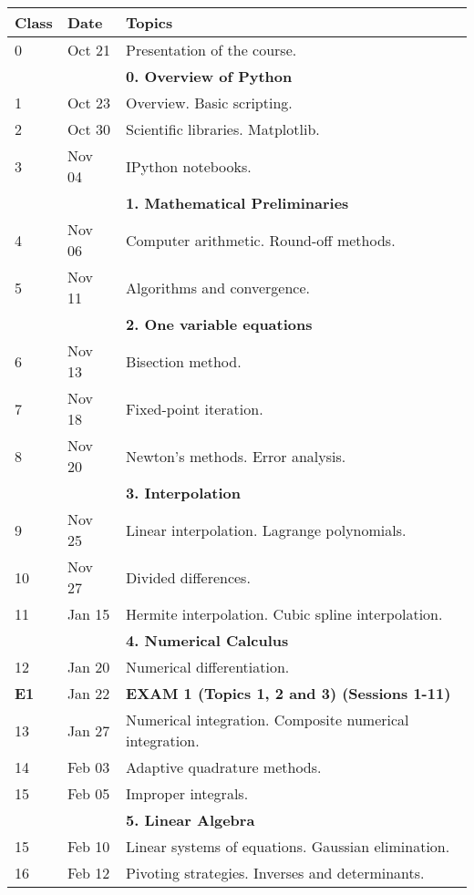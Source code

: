 \documentclass[a4,useAMS,usenatbib,usegraphicx,12pt]{article}
\begin{document}
\begin{table}[!ht]
\begin{small}
\begin{flushleft}
\begin{center}
  \begin{tabular}{l  l  l} \hline\hline
	\centering\textbf{Class} & \textbf{Date} & \textbf{Topics} \\ \hline
	0 & Oct 21& Presentation of the course. \\
	& & \textbf{0. Overview of Python} \\
	1 & Oct 23& Overview. Basic scripting. \\
	2 & Oct 30& Scientific libraries. Matplotlib. \\
	3 & Nov 04& IPython notebooks. \\
	& & \textbf{1. Mathematical Preliminaries} \\
	4 & Nov 06& Computer arithmetic. Round-off methods. \\
	5 & Nov 11& Algorithms and convergence. \\
	& & \textbf{2. One variable equations} \\
	6 & Nov 13& Bisection method. \\
	7 & Nov 18& Fixed-point iteration. \\
	8 & Nov 20& Newton's methods. Error analysis. \\
	& & \textbf{3. Interpolation} \\
	9 & Nov 25& Linear interpolation. Lagrange polynomials. \\
	10 & Nov 27& Divided differences. \\
	11 & Jan 15& Hermite interpolation. Cubic spline interpolation. \\
	& & \textbf{4. Numerical Calculus} \\
	12 & Jan 20& Numerical differentiation. \\
	\textbf{E1} & Jan 22& \textbf{EXAM 1 (Topics 1, 2 and 3) (Sessions 1-11)} \\
	13 & Jan 27& Numerical integration. Composite numerical integration. \\
	14 & Feb 03& Adaptive quadrature methods. \\
	15 & Feb 05& Improper integrals. \\
	& & \textbf{5. Linear Algebra} \\
	15 & Feb 10& Linear systems of equations. Gaussian elimination. \\
	16 & Feb 12& Pivoting strategies. Inverses and determinants. \\

\end{tabular}
\end{center}
\end{flushleft}
\end{small}
\end{table}
\end{document}
